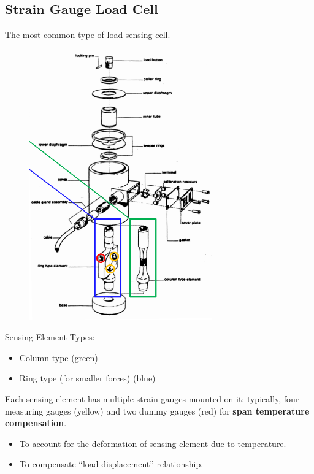 \documentclass[class=report, crop=false, 12pt,a4paper]{standalone}
\begin{document}
\subsection{Strain Gauge Load Cell}
The most common type of load sensing cell.
\begin{figure}[H]
  \centering
  \includegraphics[width = 0.7\textwidth]{../img/Mdiagram25.png}
\end{figure}
Sensing Element Types:
\begin{itemize}
  \item Column type (green)
  \item Ring type (for smaller forces) (blue)
\end{itemize}
Each sensing element has multiple strain gauges mounted on it: typically, four measuring gauges (yellow) and two dummy gauges (red) for \textbf{span temperature compensation}.
\begin{itemize}
  \item To account for the deformation of sensing element due to temperature.
  \item To compensate “load-displacement” relationship.  
\end{itemize}
\end{document}
